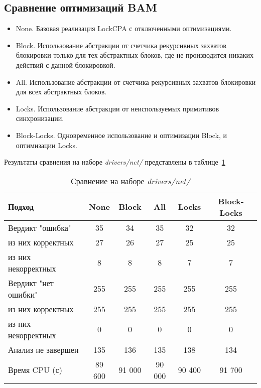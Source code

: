 
\subsection{Сравнение оптимизаций BAM}

\begin{itemize}
\item None. Базовая реализация LockCPA с отключенными оптимизациями.
\item Block. Использование абстракции от счетчика рекурсивных захватов блокировки только для тех абстрактных блоков, где не производится никаких действий с данной блокировкой.
\item All. Использование абстракции от счетчика рекурсивных захватов блокировки для всех абстрактных блоков.
\item Locks. Использование абстракции от неиспользуемых примитивов синхронизации.
\item Block-Locks. Одновременное использование и оптимизации Block, и оптимизации Locks.
\end{itemize}

Результаты сравнения на наборе \textit{drivers/net/} представлены в таблице~\ref{table-drivers-lock-reduce}

  \begin{table}[h]\footnotesize \centering
    \caption{Сравнение на наборе \textit{drivers/net/}}
  	\label{table-drivers-lock-reduce}
    \begin{tabular}{ | l | c | c | c | c | c |}
      \hline
      Подход         				& None 	& Block & All 	& Locks 	& Block-Locks \\ \hline
      Вердикт "ошибка" 				& 35   	& 34       		& 35    		& 32       	& 32     \\ 
  \hspace{0.5cm} из них корректных 	& 27 	& 26 			& 27    		& 25       	& 25   \\ 
  \hspace{0.5cm} из них некорректных & 8 	& 8 			& 8     		& 7       	& 7    \\ \hline
      Вердикт "нет ошибки"  		& 255   & 255        	& 255   		& 255       & 255     \\ 
  \hspace{0.5cm} из них корректных 	& 255 	& 255    		& 255   		& 255       & 255     \\
  \hspace{0.5cm} из них некорректных & 0 	& 0    			& 0     		& 0       	& 0  \\ \hline
      Анализ не завершен       		& 135    & 136        	& 135    		& 138       & 134  \\ \hline
      Время CPU (с)   				& 89 600 & 91 000   	& 90 000    	& 90 400    & 91 700  \\ 
      \hline
    \end{tabular}
  \end{table}

